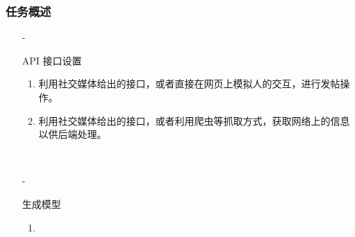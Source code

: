 \documentclass[10pt]{beamer}
\begin{document}
    \begin{frame}
        \frametitle{任务概述}
        \begin{itemize}
            \item[-]{
                API 接口设置
                \begin{enumerate}
                    \item 利用社交媒体给出的接口，或者直接在网页上模拟人的交互，进行发帖操作。
                    \item 利用社交媒体给出的接口，或者利用爬虫等抓取方式，获取网络上的信息以供后端处理。
                \end{enumerate}
                \hspace*{\fill}\\
                }
            \item[-]{
                生成模型
                \begin{enumerate}
                    \item 
                \end{enumerate}
                } 
        \end{itemize}
        
    
    \end{frame}
\end{document}
